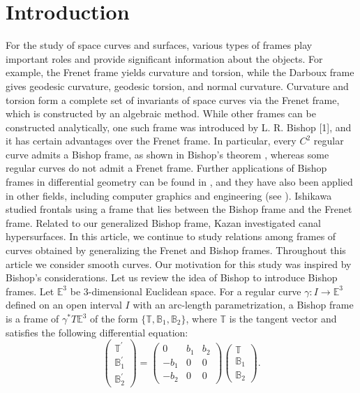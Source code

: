 \documentclass[a4paper]{amsart}
\theoremstyle{definition}
\theoremstyle{remark}
\newcommand{\EE}{\mathbb{E}}
\numberwithin{equation}{section}
\begin{document}
\section{Introduction}
For the study of space curves and surfaces, various types of frames play important roles and provide significant information about the objects. For example, the Frenet frame yields curvature and torsion, while the Darboux frame gives geodesic curvature, geodesic torsion, and normal curvature. Curvature and torsion form a complete set of invariants of space curves via the Frenet frame, which is constructed by an algebraic method. While other frames can be constructed analytically, one such frame was introduced by L. R. Bishop [1], and it has certain advantages over the Frenet frame. In particular, every $C^{2}$ regular curve admits a Bishop frame, as shown in Bishop’s theorem \cite{b}, whereas some regular curves do not admit a Frenet frame. Further applications of Bishop frames in differential geometry can be found in \cite{BG,dSdS,KT,MR}, and they have also been applied in other fields, including computer graphics and engineering (see \cite{FL,W}). Ishikawa \cite{GI} studied frontals using a frame that lies between the Bishop frame and the Frenet frame. Related to our generalized Bishop frame, Kazan \cite{KA} investigated canal hypersurfaces. In this article, we continue to study relations among frames of curves obtained by generalizing the Frenet and Bishop frames. Throughout this article we consider smooth curves. Our motivation for this study was inspired by Bishop's considerations. Let us review the idea of Bishop to introduce Bishop frames. Let $\EE^{3}$ be 3-dimensional Euclidean space. For a regular curve $\gamma : I \to \EE^{3}$ defined on an open interval $I$ with an arc-length parametrization, a Bishop frame is a frame of $\gamma^{*}T\mathbb{E}^3$ 
of the form $\{\mathbb{T}, \mathbb{B}_{1}, \mathbb{B}_{2}\}$, where $\mathbb{T}$ is the tangent vector and satisfies the following differential equation: 
\[\begin{pmatrix}
\mathbb{T}^{\prime}\\
\mathbb{B}_{1}^{\prime}\\
\mathbb{B}_{2}^{\prime}
\end{pmatrix}
=\begin{pmatrix}
0&b_{1}&b_{2}\\
-b_{1}&0&0\\
-b_{2}&0&0
\end{pmatrix}
\begin{pmatrix}
\mathbb{T}\\
\mathbb{B}_{1}\\
\mathbb{B}_{2}
\end{pmatrix}
.
\]
\end{document}
